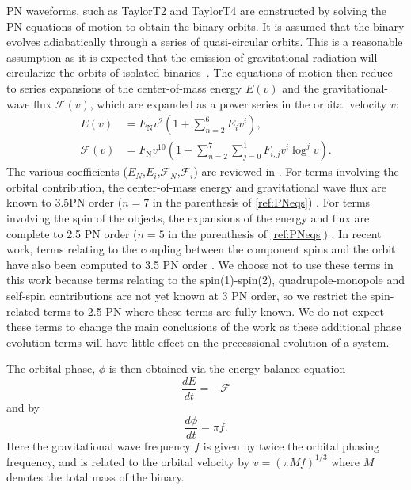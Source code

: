 \ac{PN} waveforms, such as TaylorT2 and TaylorT4 are constructed by solving the
\ac{PN} equations of motion to obtain the binary orbits. It is assumed that the
binary evolves adiabatically through a series of quasi-circular orbits. This is
a reasonable assumption as it is expected that the emission of gravitational
radiation will circularize the orbits of isolated binaries~\cite{Peters:1964zz}. 
The
equations of motion then reduce to series expansions of the center-of-mass
energy $E(v)$ and the gravitational-wave flux $\mathcal{F}(v)$, which are
expanded as a power series in the orbital velocity $v$:
%
\begin{align}
\label{ref:PNeqs}
E(v) &= E_{\mathrm{N}} v^2 \left(1+\sum_{n=2}^{6}E_i v^i\right), \\
\mathcal{F}(v) &= F_{\mathrm{N}} v^{10} \left(1+\sum_{n=2}^{7}
\sum_{j = 0}^{1}F_{i,j} v^i \log^j v\right).
\end{align}
%
The various coefficients ($E_N$,$E_i$,$\mathcal{F}_N$,$\mathcal{F}_i$) are
reviewed in \cite{Arun:2008kb,Buonanno:2009zt}. For terms involving the orbital
contribution, the center-of-mass energy and gravitational wave flux are known 
to 3.5\ac{PN} order ($n=7$ in the parenthesis of \ref{ref:PNeqs})
\cite{Wiseman:1993aj,Blanchet:1995fg,Blanchet:1995ez,Blanchet:1996pi,
Blanchet:2001ax, Blanchet:2004ek}. For terms
involving the spin of the objects, the expansions of the energy and
flux are complete to 2.5 \ac{PN} order ($n=5$ in the parenthesis of 
\ref{ref:PNeqs})
\cite{Kidder:1992fr,Kidder:1995zr,Arun:2008kb}. In recent work,
terms relating to the coupling between the component spins and the orbit have
also been computed to 3.5 \ac{PN} order \cite{Blanchet:2012sm,Bohe:2013cla}. We
choose not to use these terms in this work because terms relating to the
spin(1)-spin(2), quadrupole-monopole and self-spin contributions are not yet
known at 3 \ac{PN} order, so we restrict the spin-related terms to 2.5 \ac{PN}
where these terms are fully known. We do not expect these terms to change the 
main conclusions of the work as these additional phase evolution terms will 
have little effect on the precessional evolution of a system.

The orbital phase, $\phi$ is then obtained via the energy balance equation
%
\begin{equation}
 \frac{dE}{dt} = - \mathcal{F}
\end{equation}
%
and by
%
\begin{equation}
  \frac{d\phi}{dt} = \pi f.
\end{equation}
%
Here the gravitational wave frequency $f$ is given by twice the orbital phasing
frequency, and is related to the orbital velocity by $v = (\pi M f)^{1/3}$ 
where $M$ denotes the total mass of the binary.

